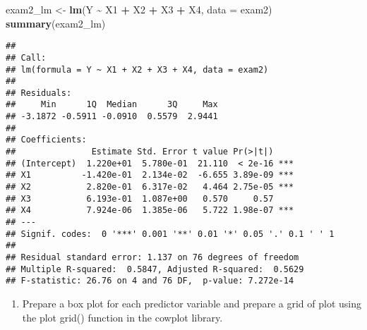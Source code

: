 \documentclass[
]{article}
\newenvironment{Shaded}{\begin{snugshade}}{\end{snugshade}}
\newcommand{\AttributeTok}[1]{\textcolor[rgb]{0.13,0.29,0.53}{#1}}
\newcommand{\FunctionTok}[1]{\textcolor[rgb]{0.13,0.29,0.53}{\textbf{#1}}}
\newcommand{\NormalTok}[1]{#1}
\newcommand{\OtherTok}[1]{\textcolor[rgb]{0.56,0.35,0.01}{#1}}
\newcommand{\SpecialCharTok}[1]{\textcolor[rgb]{0.81,0.36,0.00}{\textbf{#1}}}
\providecommand{\tightlist}{%
  \setlength{\itemsep}{0pt}\setlength{\parskip}{0pt}}
\begin{document}
\begin{Shaded}
\begin{Highlighting}[]
\NormalTok{exam2\_lm }\OtherTok{\textless{}{-}} \FunctionTok{lm}\NormalTok{(Y }\SpecialCharTok{\textasciitilde{}}\NormalTok{ X1 }\SpecialCharTok{+}\NormalTok{ X2 }\SpecialCharTok{+}\NormalTok{ X3 }\SpecialCharTok{+}\NormalTok{ X4, }\AttributeTok{data =}\NormalTok{ exam2)}
\FunctionTok{summary}\NormalTok{(exam2\_lm)}
\end{Highlighting}
\end{Shaded}

\begin{verbatim}
## 
## Call:
## lm(formula = Y ~ X1 + X2 + X3 + X4, data = exam2)
## 
## Residuals:
##     Min      1Q  Median      3Q     Max 
## -3.1872 -0.5911 -0.0910  0.5579  2.9441 
## 
## Coefficients:
##               Estimate Std. Error t value Pr(>|t|)    
## (Intercept)  1.220e+01  5.780e-01  21.110  < 2e-16 ***
## X1          -1.420e-01  2.134e-02  -6.655 3.89e-09 ***
## X2           2.820e-01  6.317e-02   4.464 2.75e-05 ***
## X3           6.193e-01  1.087e+00   0.570     0.57    
## X4           7.924e-06  1.385e-06   5.722 1.98e-07 ***
## ---
## Signif. codes:  0 '***' 0.001 '**' 0.01 '*' 0.05 '.' 0.1 ' ' 1
## 
## Residual standard error: 1.137 on 76 degrees of freedom
## Multiple R-squared:  0.5847, Adjusted R-squared:  0.5629 
## F-statistic: 26.76 on 4 and 76 DF,  p-value: 7.272e-14
\end{verbatim}

\begin{enumerate}
\def\labelenumi{(\alph{enumi})}
\tightlist
\item
  Prepare a box plot for each predictor variable and prepare a grid of
  plot using the plot grid() function in the cowplot library.
\end{enumerate}
\end{document}
